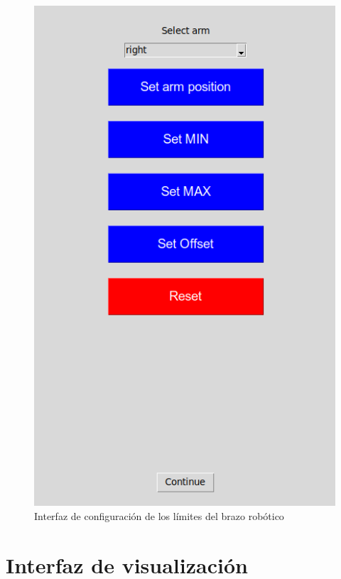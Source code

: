 \begin{figure}[ht!]
	\centering
	\begin{minipage}{0.45\linewidth}
		\centering
		\includegraphics[width=\linewidth]{figs/config_limits.png}
	\end{minipage}
	\caption[Interfaz de configuración de los límites del brazo robótico]{Interfaz de configuración de los límites del brazo robótico}
	\label{fig:config}
\end{figure}

\section{Interfaz de visualización}
\label{section:visualization}

